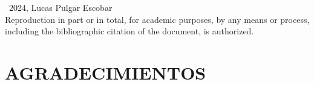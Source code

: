\documentclass[english, a4paper, 12pt, twoside, openany]{book}
\numberwithin{equation}{section}                %
\def\biblio{\clearpage} %
\begin{document}
\def\biblio{}   %

\vfill

\thispagestyle{empty}
\mbox{}                         %
\vfill                          %
\textcopyright\ 2024, Lucas Pulgar Escobar \\ %

Reproduction in part or in total, for academic purposes, by any means or process, including the bibliographic citation of the document, is authorized.
\vspace{1cm}    %
\restoregeometry %



\restoregeometry        %




\newpage
{}  %
\section*{AGRADECIMIENTOS}                       %



\end{document}
